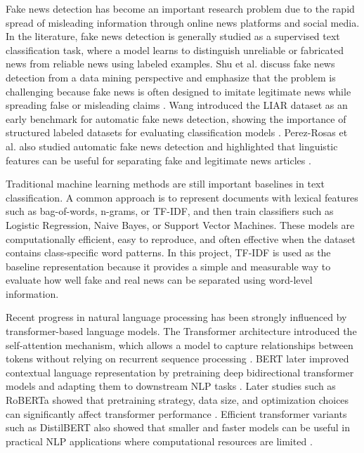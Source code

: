 \documentclass[11pt]{article}
\begin{document}
Fake news detection has become an important research problem due to the rapid spread of misleading information through online news platforms and social media. In the literature, fake news detection is generally studied as a supervised text classification task, where a model learns to distinguish unreliable or fabricated news from reliable news using labeled examples. Shu et al. discuss fake news detection from a data mining perspective and emphasize that the problem is challenging because fake news is often designed to imitate legitimate news while spreading false or misleading claims \cite{shu2017fake}. Wang introduced the LIAR dataset as an early benchmark for automatic fake news detection, showing the importance of structured labeled datasets for evaluating classification models \cite{wang2017liar}. Perez-Rosas et al. also studied automatic fake news detection and highlighted that linguistic features can be useful for separating fake and legitimate news articles \cite{perezrosas2018automatic}.

Traditional machine learning methods are still important baselines in text classification. A common approach is to represent documents with lexical features such as bag-of-words, n-grams, or TF-IDF, and then train classifiers such as Logistic Regression, Naive Bayes, or Support Vector Machines. These models are computationally efficient, easy to reproduce, and often effective when the dataset contains class-specific word patterns. In this project, TF-IDF is used as the baseline representation because it provides a simple and measurable way to evaluate how well fake and real news can be separated using word-level information.

Recent progress in natural language processing has been strongly influenced by transformer-based language models. The Transformer architecture introduced the self-attention mechanism, which allows a model to capture relationships between tokens without relying on recurrent sequence processing \cite{vaswani2017attention}. BERT later improved contextual language representation by pretraining deep bidirectional transformer models and adapting them to downstream NLP tasks \cite{devlin2019bert}. Later studies such as RoBERTa showed that pretraining strategy, data size, and optimization choices can significantly affect transformer performance \cite{liu2019roberta}. Efficient transformer variants such as DistilBERT also showed that smaller and faster models can be useful in practical NLP applications where computational resources are limited \cite{sanh2019distilbert}.
\end{document}
